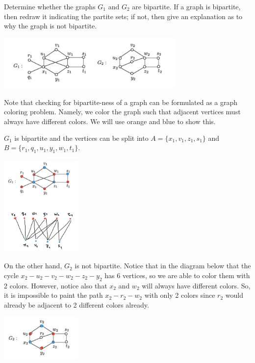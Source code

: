 \question Determine whether the graphs \(G_1\) and \(G_2\)
are bipartite. If a graph is bipartite, then redraw it
indicating the partite sets; if not, then give an 
explanation as to why the graph is not bipartite.

\begin{center}
  \includegraphics[width=0.69\textwidth]{figures/p1-graphs}
\end{center}

\begin{solution}
  Note that checking for bipartite-ness of a graph can be
  formulated as a graph coloring problem. Namely, we color the
  graph such that adjacent vertices must always have different
  colors. We will use orange and blue to show this.

  \(G_1\) is bipartite and the vertices can be split into 
  \(A = \{x_1, v_1, z_1, s_1\} \) and \(B = \{r_1, q_1, u_1,
  y_1, w_1, t_1\}\).
  \begin{center}
    \includegraphics[width=0.3\textwidth]{figures/p1-g1}
  \end{center}

  On the other hand, \(G_2\) is not bipartite. Notice that in the
  diagram below that the cycle \(x_2-u_2-v_2-w_2-z_2-y_2\) has 6
  vertices, so we are able to color them with 2 colors. However,
  notice also that \(x_2\) and \(w_2\) will always have different
  colors. So, it is impossible to paint the path \(x_2-r_2-w_2\)
  with only 2 colors since \(r_2\) would already be adjacent to
  2 different colors already.
  \begin{center}
    \includegraphics[width=0.3\textwidth]{figures/p1-g2}
  \end{center}
\end{solution}
